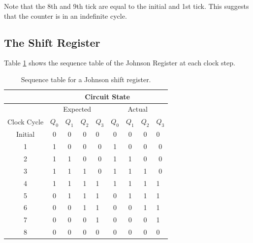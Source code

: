 \documentclass{report}
\begin{document}
	Note that the 8th and 9th tick are equal to the initial and 1st tick. This suggests that the counter is in an indefinite cycle.
	
	\subsection{The Shift Register}
	Table \ref{section8} shows the sequence table of the Johnson Register at each clock step.
	\begin{table}[h]
		\centering
		\begin{tabular}{@{}c|ccclcccl@{}}
			\toprule
			\cellcolor[HTML]{000000}                        & \multicolumn{8}{c}{Circuit State}                                   \\ \midrule
			\cellcolor[HTML]{000000}{\color[HTML]{000000} } & \multicolumn{4}{c|}{Expected}          & \multicolumn{4}{c}{Actual} \\ \midrule
			Clock Cycle                                     & $Q_{0}$ & $Q_{1}$ & $Q_{2}$ & \multicolumn{1}{l|}{$Q_{3}$} & $Q_{0}$    & $Q_{1}$   & $Q_{2}$   & $Q_{3}$   \\ \midrule
			Initial                                         & 0  & 0  & 0  & \multicolumn{1}{l|}{0}  & 0  & 0  & 0  & 0                     \\
			1                                               & 1  & 0  & 0  & \multicolumn{1}{c|}{0}  & 1  & 0  & 0  & \multicolumn{1}{c}{0} \\
			2                                               & 1  & 1  & 0  & \multicolumn{1}{c|}{0}  & 1  & 1  & 0  & \multicolumn{1}{c}{0} \\
			3                                               & 1  & 1  & 1  & \multicolumn{1}{c|}{0}  & 1  & 1  & 1  & \multicolumn{1}{c}{0} \\
			4                                               & 1  & 1  & 1  & \multicolumn{1}{l|}{1}  & 1  & 1  & 1  & 1                     \\
			5                                               & 0  & 1  & 1  & \multicolumn{1}{l|}{1}  & 0  & 1  & 1  & 1                     \\
			6                                               & 0  & 0  & 1  & \multicolumn{1}{l|}{1}  & 0  & 0  & 1  & 1                     \\
			7                                               & 0  & 0  & 0  & \multicolumn{1}{l|}{1}  & 0  & 0  & 0  & 1                     \\
			8                                               & 0  & 0  & 0  & \multicolumn{1}{l|}{0}  & 0  & 0  & 0  & 0                     \\ \bottomrule
		\end{tabular}
		\caption{Sequence table for a Johnson shift register.}
		\label{section8}
	\end{table}
	
\end{document}
